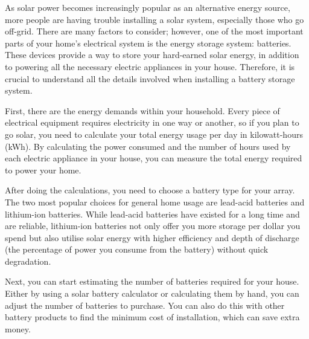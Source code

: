 \date{\today}



\maketitle
\thispagestyle{fancy}

\begin{multicols}{3}


As solar power becomes increasingly popular as an alternative energy source, more people are having trouble installing a solar system, especially those who go off-grid. There are many factors to consider; however, one of the most important parts of your home's electrical system is the energy storage system: batteries. These devices provide a way to store your hard-earned solar energy, in addition to powering all the necessary electric appliances in your house. Therefore, it is crucial to understand all the details involved when installing a battery storage system.

First, there are the energy demands within your household. Every piece of electrical equipment requires electricity in one way or another, so if you plan to go solar, you need to calculate your total energy usage per day in kilowatt-hours (kWh). By calculating the power consumed and the number of hours used by each electric appliance in your house, you can measure the total energy required to power your home.

After doing the calculations, you need to choose a battery type for your array. The two most popular choices for general home usage are lead-acid batteries and lithium-ion batteries. While lead-acid batteries have existed for a long time and are reliable, lithium-ion batteries not only offer you more storage per dollar you spend but also utilise solar energy with higher efficiency and depth of discharge (the percentage of power you consume from the battery) without quick degradation.

Next, you can start estimating the number of batteries required for your house. Either by using a solar battery calculator or calculating them by hand, you can adjust the number of batteries to purchase. You can also do this with other battery products to find the minimum cost of installation, which can save extra money.


\end{multicols}
